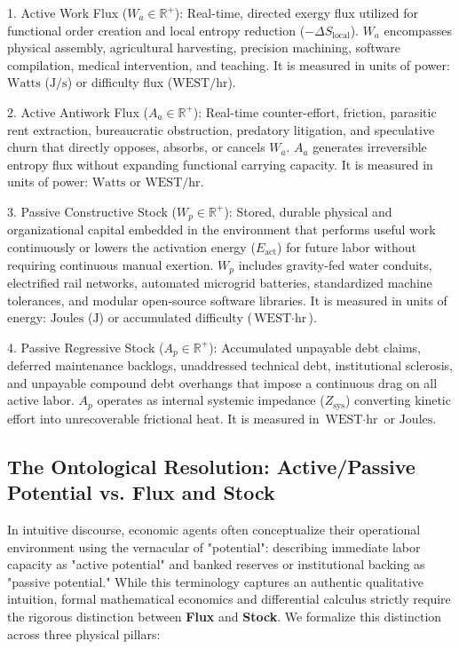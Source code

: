 \documentclass[preprint,12pt,authoryear]{elsarticle}
\theoremstyle{definition}
\begin{document}
1. Active Work Flux ($W_a \in \mathbb{R}^+$): Real-time, directed exergy flux utilized for functional order creation and local entropy reduction ($-\Delta S_{ \text{local}}$). $W_a$ encompasses physical assembly, agricultural harvesting, precision machining, software compilation, medical intervention, and teaching. It is measured in units of power: $ \text{Watts}$ ($ \text{J/s}$) or difficulty flux ($ \text{WEST/hr}$).

2. Active Antiwork Flux ($A_a \in \mathbb{R}^+$): Real-time counter-effort, friction, parasitic rent extraction, bureaucratic obstruction, predatory litigation, and speculative churn that directly opposes, absorbs, or cancels $W_a$. $A_a$ generates irreversible entropy flux without expanding functional carrying capacity. It is measured in units of power: $ \text{Watts}$ or $ \text{WEST/hr}$.

3. Passive Constructive Stock ($W_p \in \mathbb{R}^+$): Stored, durable physical and organizational capital embedded in the environment that performs useful work continuously or lowers the activation energy ($E_{ \text{act}}$) for future labor without requiring continuous manual exertion. $W_p$ includes gravity-fed water conduits, electrified rail networks, automated microgrid batteries, standardized machine tolerances, and modular open-source software libraries. It is measured in units of energy: $ \text{Joules}$ ($ \text{J}$) or accumulated difficulty ($ \text{WEST}\cdot \text{hr}$).

4. Passive Regressive Stock ($A_p \in \mathbb{R}^+$): Accumulated unpayable debt claims, deferred maintenance backlogs, unaddressed technical debt, institutional sclerosis, and unpayable compound debt overhangs that impose a continuous drag on all active labor. $A_p$ operates as internal systemic impedance ($Z_{ \text{sys}}$) converting kinetic effort into unrecoverable frictional heat. It is measured in $ \text{WEST}\cdot \text{hr}$ or $ \text{Joules}$.

\subsection{The Ontological Resolution: Active/Passive Potential vs. Flux and Stock}

In intuitive discourse, economic agents often conceptualize their operational environment using the vernacular of "potential": describing immediate labor capacity as "active potential" and banked reserves or institutional backing as "passive potential." While this terminology captures an authentic qualitative intuition, formal mathematical economics and differential calculus strictly require the rigorous distinction between \textbf{Flux} and \textbf{Stock}. We formalize this distinction across three physical pillars:
\end{document}
